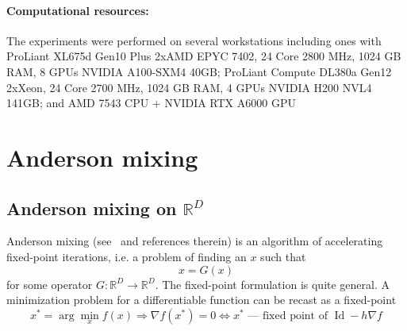 \documentclass{article} %
\numberwithin{equation}{subsection}
\numberwithin{theorem}{section}
\newcommand{\Id}{\operatorname{Id}}
\begin{document}
\paragraph{Computational resources:} 
    The experiments were performed on several workstations including ones with 
        ProLiant XL675d Gen10 Plus 2xAMD EPYC 7402, 24 Core 2800 MHz, 1024 GB RAM, 8 GPUs NVIDIA A100-SXM4 40GB; 
        ProLiant Compute DL380a Gen12 2xXeon, 24 Core 2700 MHz, 1024 GB RAM, 4 GPUs NVIDIA H200 NVL4 141GB; 
        and AMD 7543 CPU + NVIDIA RTX A6000 GPU
\FloatBarrier





\appendix


\section{Anderson mixing}
    \subsection{Anderson mixing on $\mathbb{R}^D$}
        Anderson mixing (see~\cite{fang2009two}  and references therein) is an algorithm of accelerating fixed-point iterations, i.e. a problem of finding an $x$ such that
            \[
                x = G(x)
            \]
            for some operator $G: \mathbb{R}^D \to \mathbb{R}^D$. 
        The fixed-point formulation is quite general.
        A minimization problem for a differentiable function can be recast as a fixed-point
        \begin{equation}\label{eq:fp_minimization}
            x^* = \arg\min_x f(x) \Rightarrow \nabla f(x^*) = 0 \Leftrightarrow x^*\text{~---~fixed point of~}\Id - h\nabla f
        \end{equation}
            
\end{document}
